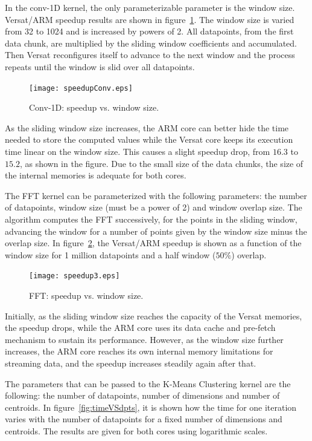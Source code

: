 \documentclass[journal]{IEEEtran}
\begin{document}
In the conv-1D kernel, the only parameterizable parameter is the
window size. Versat/ARM speedup results are shown in
figure~\ref{fig:convsu}.  The window size is varied from 32 to 1024 and
is increased by powers of 2. All datapoints, from the first data
chunk, are multiplied by the sliding window coefficients and
accumulated. Then Versat reconfigures itself to advance to the next
window and the process repeats until the window is slid over all
datapoints.

\begin{figure}[!h]
  \centering \texttt{[image: speedupConv.eps]}
  \caption{Conv-1D: speedup vs. window size.}
  \label{fig:convsu}
\end{figure}

As the sliding window size increases, the ARM core can better hide the
time needed to store the computed values while the Versat core keeps
its execution time linear on the window size. This causes a slight
speedup drop, from $16.3$ to $15.2$, as shown in the figure. Due to
the small size of the data chunks, the size of the internal memories
is adequate for both cores.


The FFT kernel can be parameterized with the following parameters: the
number of datapoints, window size (must be a power of 2) and window
overlap size. The algorithm computes the FFT successively, for the
points in the sliding window, advancing the window for a number of
points given by the window size minus the overlap size. In
figure~\ref{fig:fftsu}, the Versat/ARM speedup is shown as a function of
the window size for 1 million datapoints and a half window ($50\%$)
overlap.

\begin{figure}[!h]
  \centering \texttt{[image: speedup3.eps]}
  \caption{FFT: speedup vs. window size.}
  \label{fig:fftsu}
\end{figure}

Initially, as the sliding window size reaches the capacity of the
Versat memories, the speedup drops, while the ARM core uses its data
cache and pre-fetch mechanism to sustain its performance. However, as
the window size further increases, the ARM core reaches its own
internal memory limitations for streaming data, and the speedup
increases steadily again after that.


The parameters that can be passed to the K-Means Clustering kernel are
the following: the number of datapoints, number of dimensions and
number of centroids. In figure~\ref{fig:timeVSdpts}, it is shown how
the time for one iteration varies with the number of datapoints for a
fixed number of dimensions and centroids. The results are given for
both cores using logarithmic scales.
\end{document}
